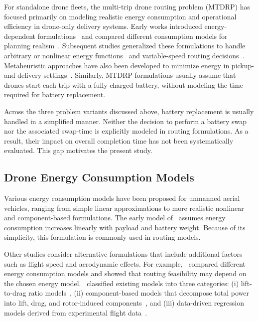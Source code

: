 \documentclass[3p, authoryear, 11pt]{elsarticle}
\begin{document}
For standalone drone fleets, the multi-trip drone routing problem (MTDRP) has focused primarily on modeling realistic energy consumption and operational efficiency in drone-only delivery systems. 
Early works introduced energy-dependent formulations~\citep{dorling_vehicle_2017,cheng_drone_2020} and compared different consumption models for planning realism~\citep{zhang_energy_2021}. 
Subsequent studies generalized these formulations to handle arbitrary or nonlinear energy functions~\citep{ahmadi-javid_delivery_2022} and variable-speed routing decisions~\citep{wu_energyefficient_2024}. 
Metaheuristic approaches have also been developed to minimize energy in pickup-and-delivery settings~\citep{kyriakakis_grasp_2023}. 
Similarly, MTDRP formulations usually assume that drones start each trip with a fully charged battery, without modeling the time required for battery replacement.

Across the three problem variants discussed above, battery replacement is usually handled in a simplified manner. Neither the decision to perform a battery swap nor the associated swap-time is explicitly modeled in routing formulations. As a result, their impact on overall completion time has not been systematically evaluated. This gap motivates the present study.

\subsection{Drone Energy Consumption Models}

Various energy consumption models have been proposed for unmanned aerial vehicles, ranging from simple linear approximations to more realistic nonlinear and component-based formulations. 
The early model of~\citet{dorling_vehicle_2017} assumes energy consumption increases linearly with payload and battery weight. Because of its simplicity, this formulation is commonly used in routing models.

Other studies consider alternative formulations that include additional factors such as flight speed and aerodynamic effects. For example,~\citet{cheng_drone_2020} compared different energy consumption models and showed that routing feasibility may depend on the chosen energy model.~\citet{zhang_energy_2021} classified existing models into three categories: 
(i) lift-to-drag ratio models~\citep{dandrea_guest_2014}, 
(ii) component-based models that decompose total power into lift, drag, and rotor-induced components~\citep{dorling_vehicle_2017,stolaroff_energy_2018,liu_power_2017}, and 
(iii) data-driven regression models derived from experimental flight data~\citep{tseng_flight_2017,alyassi_autonomous_2017}. 
\end{document}
